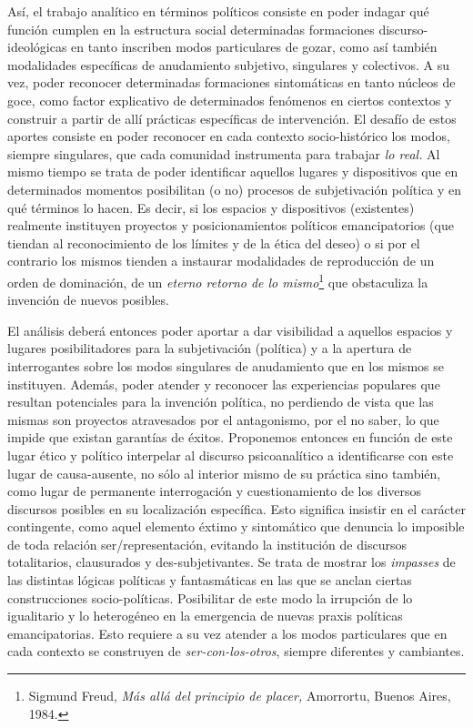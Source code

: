 \documentclass{book}
\begin{document}
Así, el trabajo analítico en términos políticos consiste en poder
indagar qué función cumplen en la estructura social determinadas
formaciones discurso-ideológicas en tanto inscriben modos particulares
de gozar, como así también modalidades específicas de anudamiento
subjetivo, singulares y colectivos. A su vez, poder reconocer
determinadas formaciones sintomáticas en tanto núcleos de goce, como
factor explicativo de determinados fenómenos en ciertos contextos y
construir a partir de allí prácticas específicas de intervención. El
desafío de estos aportes consiste en poder reconocer en cada contexto
socio-histórico los modos, siempre singulares, que cada comunidad
instrumenta para trabajar \emph{lo real.} Al mismo tiempo se trata de
poder identificar aquellos lugares y dispositivos que en determinados
momentos posibilitan (o no) procesos de subjetivación política y en qué
términos lo hacen. Es decir, si los espacios y dispositivos (existentes)
realmente instituyen proyectos y posicionamientos políticos
emancipatorios (que tiendan al reconocimiento de los límites y de la
ética del deseo) o si por el contrario los mismos tienden a instaurar
modalidades de reproducción de un orden de dominación, de un
\emph{eterno retorno de lo mismo}\footnote{Sigmund Freud, \emph{Más allá
  del principio de placer,} Amorrortu, Buenos Aires, 1984.} que
obstaculiza la invención de nuevos posibles.

El análisis deberá entonces poder aportar a dar visibilidad a aquellos
espacios y lugares posibilitadores para la subjetivación (política) y a
la apertura de interrogantes sobre los modos singulares de anudamiento
que en los mismos se instituyen. Además, poder atender y reconocer las
experiencias populares que resultan potenciales para la invención
política, no perdiendo de vista que las mismas son proyectos atravesados
por el antagonismo, por el no saber, lo que impide que existan garantías
de éxitos. Proponemos entonces en función de este lugar ético y político
interpelar al discurso psicoanalítico a identificarse con este lugar de
causa-ausente, no sólo al interior mismo de su práctica sino también,
como lugar de permanente interrogación y cuestionamiento de los diversos
discursos posibles en su localización específica. Esto significa
insistir en el carácter contingente, como aquel elemento éxtimo y
sintomático que denuncia lo imposible de toda relación
ser/representación, evitando la institución de discursos totalitarios,
clausurados y des-subjetivantes. Se trata de mostrar los \emph{impasses}
de las distintas lógicas políticas y fantasmáticas en las que se anclan
ciertas construcciones socio-políticas. Posibilitar de este modo la
irrupción de lo igualitario y lo heterogéneo en la emergencia de nuevas
praxis políticas emancipatorias. Esto requiere a su vez atender a los
modos particulares que en cada contexto se construyen de
\emph{ser-con-los-otros}, siempre diferentes y cambiantes.
\end{document}
